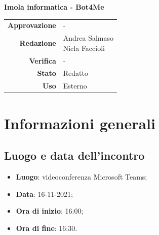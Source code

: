 \documentclass[11pt]{article}
\begin{document}
\begin{titlepage}
\begin{center}
			\large
			\textbf{Imola informatica - Bot4Me}\\ 
			
			
			
			
			\vfill
			
			
			\begin{tabular}{r|l}
				\textbf{Approvazione} &  -\\
				\textbf{Redazione} &  \parbox[t]{5cm}{Andrea Salmaso \\Nicla Faccioli}\\
				\textbf{Verifica} &  -\\
				\textbf{Stato} & Redatto \\
				\textbf{Uso} & Esterno
			\end{tabular}
			\vfill
			
		\end{center}
	\end{titlepage}

	\section{Informazioni generali}
	\subsection{Luogo e data dell'incontro}
	\begin{itemize}
		\item \textbf{Luogo}: videoconferenza Microsoft Teams;
		\item \textbf{Data}: 16-11-2021;
		\item \textbf{Ora di inizio}: 16:00;
		\item \textbf{Ora di fine}: 16:30.
	\end{itemize}
	
\end{document}
